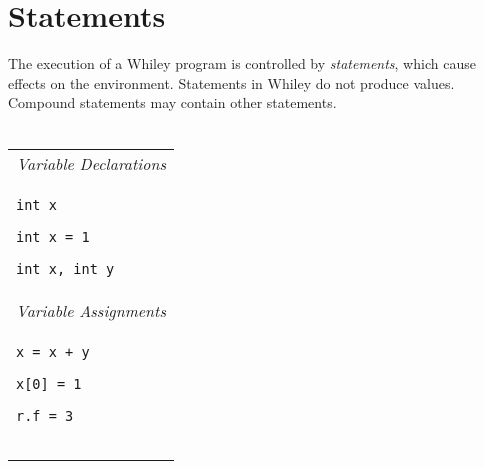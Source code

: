 \documentclass[a4paper,10pt,twcolumn]{article}
\begin{document}
\section*{Statements}
The execution of a Whiley program is controlled by {\em statements}, which cause effects on the environment.  Statements in Whiley do not produce values.  Compound statements may contain other statements.\\\\
\begin{tabular}{l}
\multicolumn{1}{r}{\em Variable Declarations}\\
\begin{minipage}[t]{2.25cm}
\begin{lstlisting}
int x
\end{lstlisting}
\end{minipage}
\hspace*{0.25cm}
\begin{minipage}[t]{2.25cm}
\begin{lstlisting}
int x = 1
\end{lstlisting}
\end{minipage}
\hspace*{0.25cm}
\begin{minipage}[t]{2.75cm}
\begin{lstlisting}
int x, int y
\end{lstlisting}
\end{minipage}
\\
\multicolumn{1}{r}{\em Variable Assignments}\\
\begin{minipage}[t]{2.25cm}
\begin{lstlisting}
x = x + y
\end{lstlisting}
\end{minipage}
\hspace*{0.2cm}
\begin{minipage}[t]{2cm}
\begin{lstlisting}
x[0] = 1
\end{lstlisting}
\end{minipage}
\hspace*{0.2cm}
\begin{minipage}[t]{1.75cm}
\begin{lstlisting}
r.f = 3
\end{lstlisting}
\end{minipage}
\hspace*{0.2cm}
\begin{minipage}[t]{1.75cm}
\begin{lstlisting}

\end{lstlisting}
\end{minipage}
\end{tabular}
\end{document}
